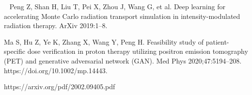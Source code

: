 \begin{thebibliography}{99}
~
Peng Z, Shan H, Liu T, Pei X, Zhou J, Wang G, et al. Deep learning for accelerating Monte Carlo radiation transport simulation in intensity-modulated radiation therapy. ArXiv 2019:1–8.

\cite{Ma2020c}
Ma S, Hu Z, Ye K, Zhang X, Wang Y, Peng H. Feasibility study of patient-specific dose verification in proton therapy utilizing positron emission tomography (PET) and generative adversarial network (GAN). Med Phys 2020;47:5194–208. https://doi.org/10.1002/mp.14443.


https://arxiv.org/pdf/2002.09405.pdf


\end{thebibliography}